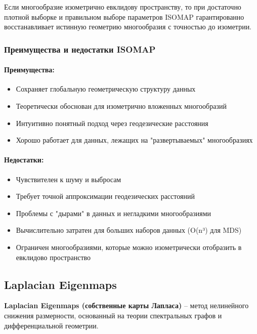 \documentclass[a4paper,12pt]{article}
\begin{document}
Если многообразие изометрично евклидову пространству, то при достаточно плотной выборке и правильном выборе параметров ISOMAP гарантированно восстанавливает истинную геометрию многообразия с точностью до изометрии.

\subsubsection{Преимущества и недостатки ISOMAP}

\paragraph{Преимущества:}
\begin{itemize}
    \item Сохраняет глобальную геометрическую структуру данных
    \item Теоретически обоснован для изометрично вложенных многообразий
    \item Интуитивно понятный подход через геодезические расстояния
    \item Хорошо работает для данных, лежащих на "развертываемых" многообразиях
\end{itemize}

\paragraph{Недостатки:}
\begin{itemize}
    \item Чувствителен к шуму и выбросам
    \item Требует точной аппроксимации геодезических расстояний
    \item Проблемы с "дырами" в данных и негладкими многообразиями
    \item Вычислительно затратен для больших наборов данных (O(n³) для MDS)
    \item Ограничен многообразиями, которые можно изометрически отобразить в евклидово пространство
\end{itemize}

\subsection{Laplacian Eigenmaps}

\textbf{Laplacian Eigenmaps (собственные карты Лапласа)} -- метод нелинейного снижения размерности, основанный на теории спектральных графов и дифференциальной геометрии.
\end{document}
